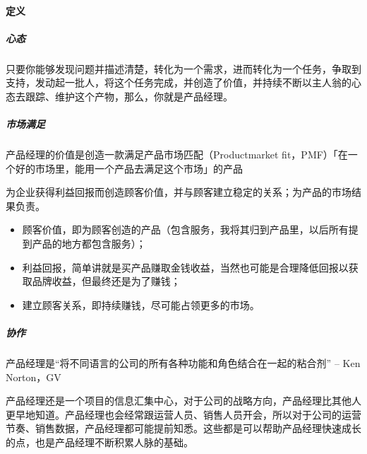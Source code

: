 \documentclass[letterpaper,11pt,english]{sphinxmanual}
\begin{document}
\paragraph{定义}
\label{\detokenize{chapter_introduction/PM:id1}}

\subparagraph{心态}
\label{\detokenize{chapter_introduction/PM:id2}}
只要你能够发现问题并描述清楚，转化为一个需求，进而转化为一个任务，争取到支持，发动起一批人，将这个任务完成，并创造了价值，并持续不断以主人翁的心态去跟踪、维护这个产物，那么，你就是产品经理。


\subparagraph{市场满足}
\label{\detokenize{chapter_introduction/PM:id3}}
产品经理的价值是创造一款满足产品\sphinxhyphen{}市场匹配（Product\sphinxhyphen{}market
fit，PMF）「在一个好的市场里，能用一个产品去满足这个市场」的产品
%
\begin{footnote}[49]\sphinxAtStartFootnote
{}
%
\end{footnote}

为企业获得利益回报而创造顾客价值，并与顾客建立稳定的关系；为产品的市场结果负责。
\begin{itemize}
\item {} 
顾客价值，即为顾客创造的产品（包含服务，我将其归到产品里，以后所有提到产品的地方都包含服务）；

\item {} 
利益回报，简单讲就是买产品赚取金钱收益，当然也可能是合理降低回报以获取品牌收益，但最终还是为了赚钱；

\item {} 
建立顾客关系，即持续赚钱，尽可能占领更多的市场。

\end{itemize}


\subparagraph{协作}
\label{\detokenize{chapter_introduction/PM:id4}}
产品经理是“将不同语言的公司的所有各种功能和角色结合在一起的粘合剂” – Ken
Norton，GV %
\begin{footnote}[50]\sphinxAtStartFootnote
{}
%
\end{footnote}

产品经理还是一个项目的信息汇集中心，对于公司的战略方向，产品经理比其他人更早地知道。产品经理也会经常跟运营人员、销售人员开会，所以对于公司的运营节奏、销售数据，产品经理都可能提前知悉。这些都是可以帮助产品经理快速成长的点，也是产品经理不断积累人脉的基础。
%
\begin{footnote}[51]\sphinxAtStartFootnote
{}
%
\end{footnote}
\end{document}
